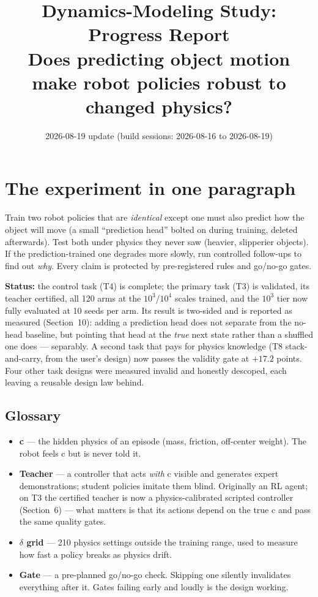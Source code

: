\documentclass[10pt]{article}
\title{\textbf{Dynamics-Modeling Study: Progress Report}\\[2pt]
\large Does predicting object motion make robot policies robust to changed physics?}
\author{}
\date{2026-08-19 update \quad (build sessions: 2026-08-16 to 2026-08-19)}
\begin{document}
\maketitle
\vspace{-2.5em}

\section{The experiment in one paragraph}
Train two robot policies that are \emph{identical} except one must also predict how
the object will move (a small ``prediction head'' bolted on during training, deleted
afterwards). Test both under physics they never saw (heavier, slipperier objects).
If the prediction-trained one degrades more slowly, run controlled follow-ups to find
out \emph{why}. Every claim is protected by pre-registered rules and go/no-go gates.

\textbf{Status:} the control task (T4) is complete; the primary task (T3) is
validated, its teacher certified, all 120 arms at the $10^3$/$10^4$ scales trained,
and the $10^3$ tier now fully evaluated at 10 seeds per arm. Its result is
two-sided and is reported as measured (Section~10): adding a prediction head does
not separate from the no-head baseline, but pointing that head at the \emph{true}
next state rather than a shuffled one does --- separably. A second task that pays
for physics knowledge (T8 stack-and-carry, from the user's design) now passes the
validity gate at $+17.2$ points. Four other task designs were measured invalid and
honestly descoped, each leaving a reusable design law behind.

\subsection*{Glossary}
\begin{itemize}
\item \textbf{c} --- the hidden physics of an episode (mass, friction, off-center
weight). The robot feels c but is never told it.
\item \textbf{Teacher} --- a controller that acts \emph{with} c visible and
generates expert demonstrations; student policies imitate them blind. Originally
an RL agent; on T3 the certified teacher is now a physics-calibrated scripted
controller (Section~6) --- what matters is that its actions depend on the true c
and pass the same quality gates.
\item \textbf{$\delta$ grid} --- 210 physics settings outside the training range,
used to measure how fast a policy breaks as physics drift.
\item \textbf{Gate} --- a pre-planned go/no-go check. Skipping one silently
invalidates everything after it. Gates failing early and loudly is the design working.
\end{itemize}
\end{document}
